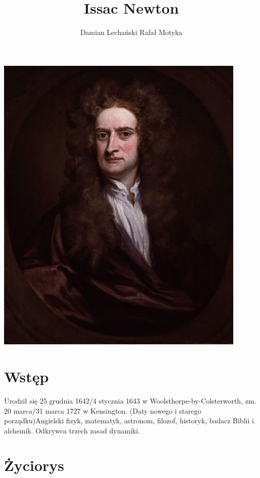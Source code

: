 \documentclass{article}
\title{Issac Newton}
\author{Damian Lechański \break Rafał Motyka}
\begin{document}
\maketitle

\centerline{\includegraphics[width=120mm,scale=0.6]{images/Newton.jpg}}



\newpage
\section{Wstęp}
Urodził się 25 grudnia 1642/4 stycznia 1643 w Woolsthorpe-by-Colsterworth, zm. 20 marca/31 marca 1727 w Kensington. (Daty nowego i starego porządku)\newline Angielski fizyk, matematyk, astronom, filozof, historyk, badacz Biblii i alchemik. Odkrywca trzech zasad dynamiki.

\section{Życiorys}
\end{document}
